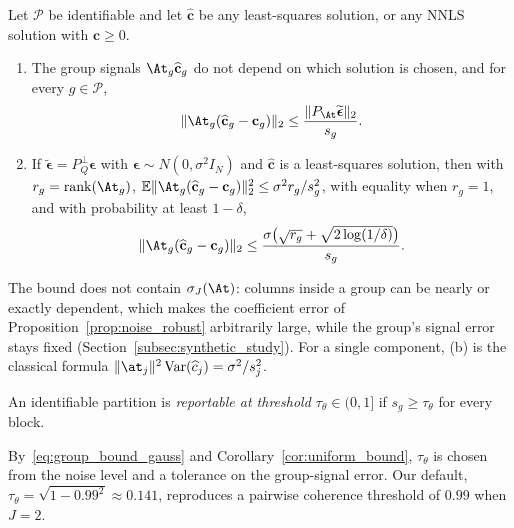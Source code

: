 \begin{theorem}
\label{thm:group_error}
Let \(\mathcal P\) be identifiable and let \(\widehat{\mathbf c}\) be any
least-squares solution, or any NNLS solution with \(\mathbf c\ge0\).
\begin{enumerate}[label=(\alph*),leftmargin=*,itemsep=0pt,topsep=2pt]
  \item The group signals \(\At_g\widehat{\mathbf c}_g\) do not depend on which
  solution is chosen, and for every \(g\in\mathcal P\),
  \begin{equation}
  \|\At_g(\widehat{\mathbf c}_g-\mathbf c_g)\|_2
  \le
  \frac{\|P_{\At}\widetilde{\boldsymbol\epsilon}\|_2}{s_g}.
  \label{eq:group_bound}
  \end{equation}
  \item If \(\widetilde{\boldsymbol\epsilon}=P_Q^\perp\boldsymbol\epsilon\) with
  \(\boldsymbol\epsilon\sim N(0,\sigma^2 I_N)\) and \(\widehat{\mathbf c}\) is a
  least-squares solution, then with \(r_g=\operatorname{rank}(\At_g)\),
  \(\mathbb E\|\At_g(\widehat{\mathbf c}_g-\mathbf c_g)\|_2^2\le\sigma^2r_g/s_g^2\),
  with equality when \(r_g=1\), and with probability at least \(1-\delta\),
  \begin{equation}
  \|\At_g(\widehat{\mathbf c}_g-\mathbf c_g)\|_2
  \le
  \frac{\sigma\bigl(\sqrt{r_g}+\sqrt{2\log(1/\delta)}\bigr)}{s_g}.
  \label{eq:group_bound_gauss}
  \end{equation}
\end{enumerate}
\end{theorem}

The bound does not contain \(\sigma_J(\At)\): columns inside a group can be nearly or
exactly dependent, which makes the coefficient error of
Proposition~\ref{prop:noise_robust} arbitrarily large, while the group's signal error
stays fixed (Section~\ref{subsec:synthetic_study}).  For a single component, (b) is
the classical formula \(\|\at_j\|^2\operatorname{Var}(\widehat c_j)=\sigma^2/s_j^2\).

\begin{definition}
\label{def:reportable}
An identifiable partition is \emph{reportable at threshold \(\tau_\theta\in(0,1]\)}
if \(s_g\ge\tau_\theta\) for every block.
\end{definition}

By~\eqref{eq:group_bound_gauss} and Corollary~\ref{cor:uniform_bound}, \(\tau_\theta\) is chosen from the noise level and a
tolerance on the group-signal error.  Our default, \(\tau_\theta=\sqrt{1-0.99^2}\approx
0.141\), reproduces a pairwise coherence threshold of \(0.99\) when \(J=2\).

